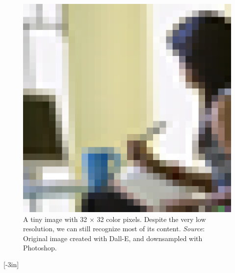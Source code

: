 \begin{figure}[h!]
    \centerline{
        \includegraphics[width=.8\linewidth]{figures/visionscience/DALLE_32x32.png}
    }
    \caption{A tiny image with 32 $\times$ 32 color pixels. Despite the very low resolution, we can still recognize most of its content. {\em Source}: Original image created with Dall-E, and downsampled with Photoshop.}
    \label{fig:pexels-retha-ferguson}
\end{figure}


[-3in]

